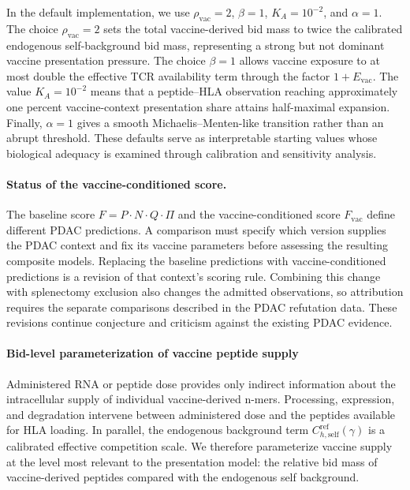 \documentclass[11pt]{article}
\begin{document}
In the default implementation, we use \(\rho_{\mathrm{vac}}=2\),
\(\beta=1\), \(K_A=10^{-2}\), and \(\alpha=1\). The choice
\(\rho_{\mathrm{vac}}=2\) sets the total vaccine-derived bid mass to twice the
calibrated endogenous self-background bid mass, representing a strong but not
dominant vaccine presentation pressure. The choice \(\beta=1\) allows vaccine
exposure to at most double the effective TCR availability term through the
factor \(1+E_{\mathrm{vac}}\). The value \(K_A=10^{-2}\) means that a
peptide--HLA observation reaching approximately one percent vaccine-context
presentation share attains half-maximal expansion. Finally, \(\alpha=1\) gives a
smooth Michaelis--Menten-like transition rather than an abrupt threshold. These
defaults serve as interpretable starting values whose biological adequacy is
examined through calibration and sensitivity analysis.

\paragraph{Status of the vaccine-conditioned score.}

The baseline score \(F=P\cdot N\cdot Q\cdot\Pi\) and the vaccine-conditioned
score \(F_{\mathrm{vac}}\) define different PDAC predictions. A comparison must
specify which version supplies the PDAC context and fix its vaccine parameters
before assessing the resulting composite models. Replacing the baseline
predictions with vaccine-conditioned predictions is a revision of that
context's scoring rule. Combining this change with splenectomy exclusion also
changes the admitted observations, so attribution requires the separate
comparisons described in the PDAC refutation data. These revisions continue
conjecture and criticism against the existing PDAC evidence.

\paragraph{Bid-level parameterization of vaccine peptide supply}

Administered RNA or peptide dose provides only indirect information about the
intracellular supply of individual vaccine-derived n-mers. Processing,
expression, and degradation intervene between administered dose and the
peptides available for HLA loading. In parallel, the endogenous background term
\(C^{\mathrm{ref}}_{h,\mathrm{self}}(\gamma)\) is a calibrated effective
competition scale. We therefore parameterize vaccine supply at the level most
relevant to the presentation model: the relative bid mass of vaccine-derived
peptides compared with the endogenous self background.
\end{document}
